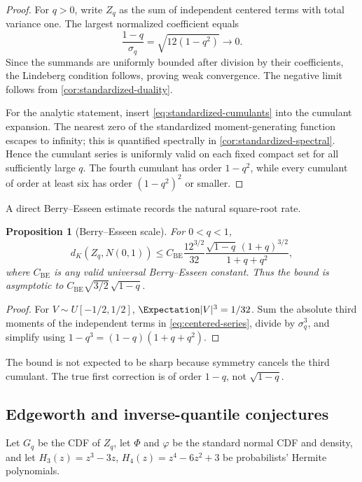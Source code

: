 \documentclass[11pt,oneside]{article}
\newtheorem{proposition}[theorem]{Proposition}
\theoremstyle{definition}
\theoremstyle{remark}
\newcommand{\PhiN}{\Phi}
\newcommand{\phiN}{\varphi}
\begin{document}
\begin{proof}
For $q>0$, write $Z_q$ as the sum of independent centered terms with total variance one.  The largest normalized coefficient equals
\[
 \frac{1-q}{\sigma_q}=\sqrt{12(1-q^2)}\longrightarrow0.
\]
Since the summands are uniformly bounded after division by their coefficients, the Lindeberg condition follows, proving weak convergence.  The negative limit follows from \cref{cor:standardized-duality}.

For the analytic statement, insert \cref{eq:standardized-cumulants} into the cumulant expansion.  The nearest zero of the standardized moment-generating function escapes to infinity; this is quantified spectrally in \cref{cor:standardized-spectral}.  Hence the cumulant series is uniformly valid on each fixed compact set for all sufficiently large $q$.  The fourth cumulant has order $1-q^2$, while every cumulant of order at least six has order $(1-q^2)^2$ or smaller.
\end{proof}

A direct Berry--Esseen estimate records the natural square-root rate.

\begin{proposition}[Berry--Esseen scale]\label{prop:berry-esseen}
For $0<q<1$,
\begin{equation}\label{eq:berry-esseen}
 d_K(Z_q,N(0,1))
 \le C_{\mathrm{BE}}\frac{12^{3/2}}{32}
 \frac{\sqrt{1-q}\,(1+q)^{3/2}}{1+q+q^2},
\end{equation}
where $C_{\mathrm{BE}}$ is any valid universal Berry--Esseen constant.  Thus the bound is asymptotic to
$C_{\mathrm{BE}}\sqrt{3/2}\,\sqrt{1-q}$.
\end{proposition}

\begin{proof}
For $V\sim U[-1/2,1/2]$, $\Expectation|V|^3=1/32$.  Sum the absolute third moments of the independent terms in \cref{eq:centered-series}, divide by $\sigma_q^3$, and simplify using $1-q^3=(1-q)(1+q+q^2)$.
\end{proof}

The bound is not expected to be sharp because symmetry cancels the third cumulant.  The true first correction is of order $1-q$, not $\sqrt{1-q}$.

\subsection{Edgeworth and inverse-quantile conjectures}

Let $G_q$ be the CDF of $Z_q$, let $\PhiN$ and $\phiN$ be the standard normal CDF and density, and let $H_3(z)=z^3-3z$, $H_4(z)=z^4-6z^2+3$ be probabilists' Hermite polynomials.
\end{document}
